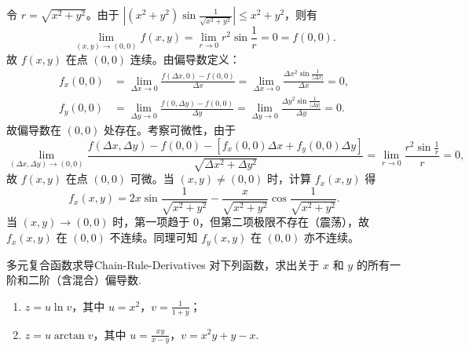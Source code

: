 \begin{myproof}
    令 $r = \sqrt{x^2 + y^2}$。由于 $\left| (x^2 + y^2) \sin \frac{1}{\sqrt{x^2+y^2}} \right| \leq x^2 + y^2$，则有
    \begin{equation}
        \lim_{(x,y) \to (0,0)} f(x,y) = \lim_{r \to 0} r^2 \sin \frac{1}{r} = 0 = f(0,0).
    \end{equation}
    故 $f(x,y)$ 在点 $(0,0)$ 连续。由偏导数定义：
    \begin{equation}
        \begin{aligned}
            f_x(0,0) & = \lim_{\Delta x \to 0} \frac{f(\Delta x, 0) - f(0,0)}{\Delta x} = \lim_{\Delta x \to 0} \frac{\Delta x^2 \sin \frac{1}{|\Delta x|}}{\Delta x} = 0, \\
            f_y(0,0) & = \lim_{\Delta y \to 0} \frac{f(0, \Delta y) - f(0,0)}{\Delta y} = \lim_{\Delta y \to 0} \frac{\Delta y^2 \sin \frac{1}{|\Delta y|}}{\Delta y} = 0.
        \end{aligned}
    \end{equation}
    故偏导数在 $(0,0)$ 处存在。考察可微性，由于
    \begin{equation}
        \lim_{(\Delta x, \Delta y) \to (0,0)} \frac{f(\Delta x, \Delta y) - f(0,0) - [f_x(0,0) \Delta x + f_y(0,0) \Delta y]}{\sqrt{\Delta x^2 + \Delta y^2}} = \lim_{r \to 0} \frac{r^2 \sin \frac{1}{r}}{r} = 0,
    \end{equation}
    故 $f(x,y)$ 在点 $(0,0)$ 可微。当 $(x,y) \neq (0,0)$ 时，计算 $f_x(x,y)$ 得
    \begin{equation}
        f_x(x,y) = 2x \sin \frac{1}{\sqrt{x^2 + y^2}} - \frac{x}{\sqrt{x^2 + y^2}} \cos \frac{1}{\sqrt{x^2 + y^2}}.
    \end{equation}
    当 $(x,y) \to (0,0)$ 时，第一项趋于 $0$，但第二项极限不存在（震荡），故 $f_x(x,y)$ 在 $(0,0)$ 不连续。同理可知 $f_y(x,y)$ 在 $(0,0)$ 亦不连续。
\end{myproof}

\begin{problem}{多元复合函数求导}{Chain-Rule-Derivatives}
    对下列函数，求出关于 $x$ 和 $y$ 的所有一阶和二阶（含混合）偏导数.
    \begin{enumerate}
        \item $z = u \ln v$，其中 $u = x^2$，$v = \frac{1}{1+y}$；
        \item $z = u \arctan v$，其中 $u = \frac{xy}{x-y}$，$v = x^2y + y - x$.
    \end{enumerate}
\end{problem}

